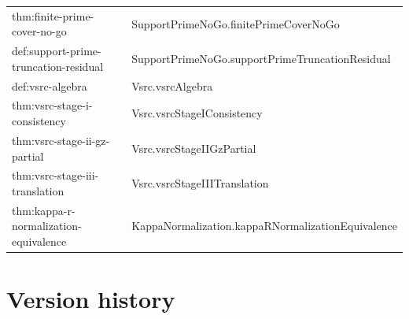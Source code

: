 \documentclass[11pt]{article}
\theoremstyle{definition}
\begin{document}
\begin{small}
\begin{longtable}{@{}>{\ttfamily\raggedright\arraybackslash}p{} >{\ttfamily\raggedright\arraybackslash}p{}@{}}
thm:\allowbreak finite-\allowbreak prime-\allowbreak cover-\allowbreak no-\allowbreak go & Support\allowbreak Prime\allowbreak No\allowbreak Go.\allowbreak finite\allowbreak Prime\allowbreak Cover\allowbreak No\allowbreak Go \\
def:\allowbreak support-\allowbreak prime-\allowbreak truncation-\allowbreak residual & Support\allowbreak Prime\allowbreak No\allowbreak Go.\allowbreak support\allowbreak Prime\allowbreak Truncation\allowbreak Residual \\
def:\allowbreak vsrc-\allowbreak algebra & Vsrc.\allowbreak vsrc\allowbreak Algebra \\
thm:\allowbreak vsrc-\allowbreak stage-\allowbreak i-\allowbreak consistency & Vsrc.\allowbreak vsrc\allowbreak Stage\allowbreak IConsistency \\
thm:\allowbreak vsrc-\allowbreak stage-\allowbreak ii-\allowbreak gz-\allowbreak partial & Vsrc.\allowbreak vsrc\allowbreak Stage\allowbreak IIGz\allowbreak Partial \\
thm:\allowbreak vsrc-\allowbreak stage-\allowbreak iii-\allowbreak translation & Vsrc.\allowbreak vsrc\allowbreak Stage\allowbreak IIITranslation \\
thm:\allowbreak kappa-\allowbreak r-\allowbreak normalization-\allowbreak equivalence & Kappa\allowbreak Normalization.\allowbreak kappa\allowbreak RNormalization\allowbreak Equivalence \\
\end{longtable}
\end{small}
 
\section{Version history}\label{app:version-history}
\end{document}
